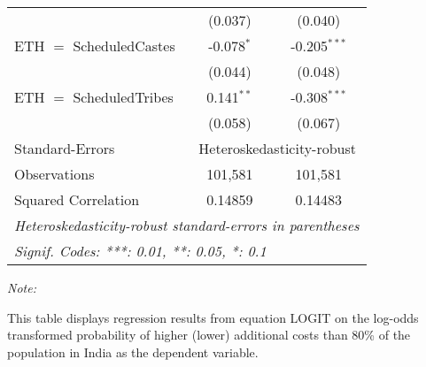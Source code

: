 \begin{table}[htbp!]
\begin{adjustbox}{width = 1\textwidth, max height = 0.95\textheight, center}
\begin{threeparttable}[b]
\begin{tabular}{lcc}
                                    & (0.037)        & (0.040)\\   
            ETH $=$ ScheduledCastes & -0.078$^{*}$   & -0.205$^{***}$\\   
                                    & (0.044)        & (0.048)\\   
            ETH $=$ ScheduledTribes & 0.141$^{**}$   & -0.308$^{***}$\\   
                                    & (0.058)        & (0.067)\\   
            \midrule 
            Standard-Errors & \multicolumn{2}{c}{Heteroskedasticity-robust} \\ 
            Observations            & 101,581        & 101,581\\  
            Squared Correlation     & 0.14859        & 0.14483\\  
            \midrule \midrule
            \multicolumn{3}{l}{\emph{Heteroskedasticity-robust standard-errors in parentheses}}\\
            \multicolumn{3}{l}{\emph{Signif. Codes: ***: 0.01, **: 0.05, *: 0.1}}\\
         \end{tabular}
         
         \begin{tablenotes}\item \medskip \textit{Note:}
            \item This table displays regression results from equation LOGIT on the log-odds transformed probability of higher (lower) additional costs than 80\% of the population in India as the dependent variable. 
         \end{tablenotes}
      \end{threeparttable}
   \end{adjustbox}
\end{table}


